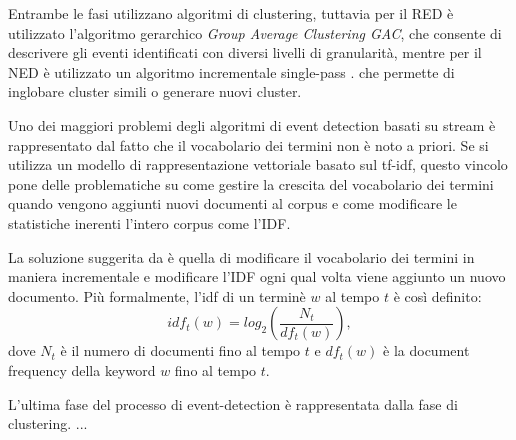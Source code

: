 Entrambe le fasi utilizzano algoritmi di clustering, tuttavia per il RED è utilizzato l'algoritmo gerarchico \emph{Group Average Clustering GAC}, che consente di descrivere gli eventi identificati con diversi livelli di granularità, mentre per il NED è utilizzato un algoritmo incrementale single-pass \cite{Allan:2002:TDT:772260,Yang:1998:SRO:290941.290953}.
che permette di inglobare cluster simili o generare nuovi cluster.

Uno dei maggiori problemi degli algoritmi di event detection basati su stream è rappresentato dal fatto che il vocabolario dei termini non è noto a priori.  
Se si utilizza un modello di rappresentazione vettoriale basato sul tf-idf, questo vincolo pone delle problematiche su come gestire la crescita del vocabolario dei termini quando vengono aggiunti nuovi documenti al corpus e come modificare le statistiche inerenti l'intero corpus come l'IDF. 

La soluzione suggerita da  \cite{Yang:1998:SRO:290941.290953} è quella di modificare il vocabolario dei termini in maniera incrementale e modificare l'IDF ogni qual volta viene aggiunto un nuovo documento. 
Più formalmente, l'idf di un terminè $w$ al tempo $t$ è così definito:
\begin{equation}
\label{eq:incIDF}
idf_t(w)=log_2 \left(\frac{N_t}{df_t(w)} \right), 
\end{equation}
dove $N_t$ è il numero di documenti fino al tempo $t$ e $df_t(w)$ è la document frequency della keyword $w$ fino al tempo $t$.

L'ultima fase del processo di event-detection è rappresentata dalla fase di clustering.
...

